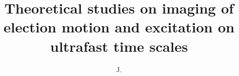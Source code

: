 \documentclass[defaultstyle,11pt]{thesis}
\title{Theoretical studies on imaging of election motion and excitation on ultrafast time scales}
\author{J.}{Venzke}
\begin{document}









\nocite{*}		%

% 
% 
\end{document}
